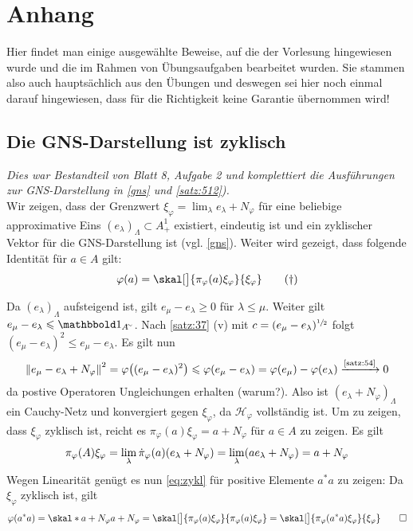 

\cleardoubleoddemptypage
{}
\setcounter{page}{1}
\cleardoubleoddemptypage
\appendix

\section{Anhang} %
\label{sec:anhang}
Hier findet man einige ausgewählte Beweise, auf die der Vorlesung hingewiesen wurde und die im Rahmen von Übungsaufgaben bearbeitet wurden.
Sie stammen also auch hauptsächlich aus den Übungen und deswegen sei hier noch einmal darauf hingewiesen, dass für die Richtigkeit keine Garantie übernommen wird!

\subsection{Die GNS-Darstellung ist zyklisch} %
\label{sub:gns_zyklisch}
\emph{Dies war Bestandteil von Blatt 8, Aufgabe 2 und komplettiert die Ausführungen zur GNS-Darstellung in \autoref{gns} und \autoref{satz:512}).} \smallskip \\
Wir zeigen, dass der Grenzwert $\xi_\varphi = \lim_\lambda e_\lambda + N_\varphi$ für eine beliebige approximative Eins $(e_\lambda)_\Lambda \subset A^1_+$ existiert, eindeutig ist und ein zyklischer Vektor für die GNS-Darstellung ist (vgl. \autoref{gns}).
Weiter wird gezeigt, dass folgende Identität für $a \in A$ gilt:
\begin{equation}
	\varphi(a) = \skal[\big]{\pi_\varphi(a)\xi_\varphi}{\xi_\varphi}
	\label{eq:zykl} \tag{\dag}
\end{equation}
\begin{beweis}
	Da $(e_\lambda)_\Lambda$ aufsteigend ist, gilt $e_\mu - e_\lambda \ge 0$ für $\lambda \le \mu$. 
	Weiter gilt $e_\mu - e_\lambda \le \ind_{A^\simm}$.
	Nach \autoref{satz:37} (v) mit $c=(e_\mu -e_\lambda)^{\sfrac{1}{2}}$ folgt $(e_\mu -e_\lambda)^2 \le e_\mu -e_\lambda$.
	Es gilt nun
	\[
		\norm*{e_\mu - e_\lambda + N_\varphi}^2 = \varphi \enbrace[\big]{(e_\mu-e_\lambda)^2} \le \varphi(e_\mu -e_\lambda)= \varphi(e_\mu)- \varphi(e_\lambda)
		\grenzw{\mbox{\scriptsize\ref{satz:54}}} 0
	\]
	da postive Operatoren Ungleichungen erhalten (warum?).
	Also ist $(e_\lambda +N_\varphi)_\Lambda$ ein Cauchy-Netz und konvergiert gegen $\xi_\varphi$, da $\mathcal{H}_\varphi$ vollständig ist.
	Um zu zeigen, dass $\xi_\varphi$ zyklisch ist, reicht es $\pi_\varphi(a) \xi_\varphi = a + N_\varphi$ für $a \in A$ zu zeigen. Es gilt
	\[
		\pi_\varphi(A) \xi_\varphi = \lim_\lambda \dot{\pi}_\varphi(a) \enbrace*{e_\lambda +N_\varphi} = \lim_\lambda \enbrace*{a e_\lambda + N_\varphi} = a+ N_\varphi
	\]
	Wegen Linearität genügt es nun \eqref{eq:zykl} für positive Elemente $a^*a$ zu zeigen: Da $\xi_\varphi$ zyklisch ist, gilt
	\[
		\varphi(a^*a) = \skal*{a+ N_\varphi}{a+N_\varphi} = \skal[\big]{\pi_\varphi(a) \xi_\varphi}{\pi_\varphi(a)\xi_\varphi} = \skal[\big]{\pi_\varphi(a^*a)\xi_\varphi}{\xi_\varphi}\qedhere
	\]
\end{beweis} 

